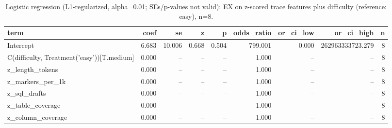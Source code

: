 \begin{table}[htbp]
\caption{Logistic regression (L1-regularized, alpha=0.01; SEs/p-values not valid): EX on z-scored trace features plus difficulty (reference: easy), n=8.}
\label{tab:task2_logit}
\begin{tabular}{lrrrrrrrr}
\toprule
term & coef & se & z & p & odds\_ratio & or\_ci\_low & or\_ci\_high & n \\
\midrule
Intercept & 6.683 & 10.006 & 0.668 & 0.504 & 799.001 & 0.000 & 262963333723.279 & 8 \\
C(difficulty, Treatment('easy'))[T.medium] & 0.000 & -- & -- & -- & 1.000 & -- & -- & 8 \\
z_length_tokens & 0.000 & -- & -- & -- & 1.000 & -- & -- & 8 \\
z_markers_per_1k & 0.000 & -- & -- & -- & 1.000 & -- & -- & 8 \\
z_sql_drafts & 0.000 & -- & -- & -- & 1.000 & -- & -- & 8 \\
z_table_coverage & 0.000 & -- & -- & -- & 1.000 & -- & -- & 8 \\
z_column_coverage & 0.000 & -- & -- & -- & 1.000 & -- & -- & 8 \\
\bottomrule
\end{tabular}
\end{table}

